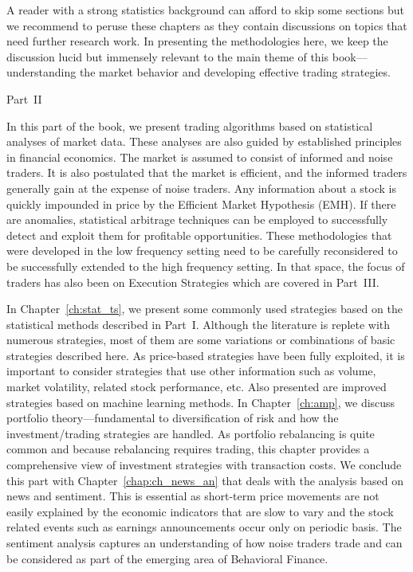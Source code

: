 A reader with a strong statistics background can afford to skip some sections but we recommend to peruse these chapters as they contain discussions on topics that need further research work. In presenting the methodologies here, we keep the discussion lucid but immensely relevant to the main theme of this book---understanding the market behavior and developing effective trading strategies. 



\noindent Part~II \par\vspace{2\baselineskip}

In this part of the book, we present trading algorithms based on statistical analyses of market data. These analyses are also guided by established principles in financial economics. The market is assumed to consist of informed and noise traders. It is also postulated that the market is efficient, and the informed traders generally gain at the expense of noise traders. Any information about a stock is quickly impounded in price by the Efficient Market Hypothesis (EMH). If there are anomalies, statistical arbitrage techniques can be employed to successfully detect and exploit them for profitable opportunities. These methodologies that were developed in the low frequency setting need to be carefully reconsidered to be successfully extended to the high frequency setting. In that space, the focus of traders has also been on Execution Strategies which are covered in Part~III.


In Chapter~\ref{ch:stat_ts}, we present some commonly used strategies based on the statistical methods described in Part~I. Although the literature is replete with numerous strategies, most of them are some variations or combinations of basic strategies described here. As price-based strategies have been fully exploited, it is important to consider strategies that use other information such as volume, market volatility, related stock performance, etc. Also presented are improved strategies based on machine learning methods. In Chapter~\ref{ch:amp}, we discuss portfolio theory---fundamental to diversification of risk and how the investment/trading strategies are handled. As portfolio rebalancing is quite common and because rebalancing requires trading, this chapter provides a comprehensive view of investment strategies with transaction costs. We conclude this part with Chapter~\ref{chap:ch_news_an} that deals with the analysis based on news and sentiment. This is essential as short-term price movements are not easily explained by the economic indicators that are slow to vary and the stock related events such as earnings announcements occur only on periodic basis. The sentiment analysis captures an understanding of how noise traders trade and can be considered as part of the emerging area of Behavioral Finance. 



